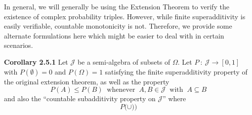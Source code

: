 \documentclass{article}
\begin{document}
In general, we will generally be using the Extension Theorem to verify the existence of complex probability triples. However, while finite superadditivity is easily verifiable, countable monotonicity is not. Therefore, we provide some alternate formulations here which might be easier to deal with in certain scenarios. 

\bigskip

\noindent \textbf{Corollary 2.5.1} Let $\mathcal{J}$ be a semi-algebra of subsets of $\Omega$. Let $P \: : \: \mathcal{J} \to [0,1]$ with $P(\emptyset) = 0$ and $P(\Omega) = 1$ satisfying the finite superadditivity property of the original extension theorem, as well as the property \[P(A) \leq P(B) \;\; \text{whenever} \;\; A,B \in \mathcal{J} \;\; \text{with} \;\; A \subseteq B\] and also the ``countable subadditivity property on $\mathcal{J}$'' where \[P\Big(\cup )\Big) \]
\end{document}
